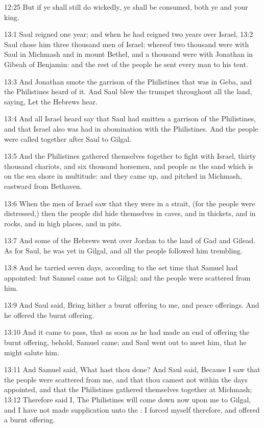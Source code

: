 12:25 But if ye shall still do wickedly, ye shall be consumed, both ye and your king.

13:1 Saul reigned one year; and when he had reigned two years over Israel, 13:2 Saul chose him three thousand men of Israel; whereof two thousand were with Saul in Michmash and in mount Bethel, and a thousand were with Jonathan in Gibeah of Benjamin: and the rest of the people he sent every man to his tent.

13:3 And Jonathan smote the garrison of the Philistines that was in Geba, and the Philistines heard of it. And Saul blew the trumpet throughout all the land, saying, Let the Hebrews hear.

13:4 And all Israel heard say that Saul had smitten a garrison of the Philistines, and that Israel also was had in abomination with the Philistines. And the people were called together after Saul to Gilgal.

13:5 And the Philistines gathered themselves together to fight with Israel, thirty thousand chariots, and six thousand horsemen, and people as the sand which is on the sea shore in multitude: and they came up, and pitched in Michmash, eastward from Bethaven.

13:6 When the men of Israel saw that they were in a strait, (for the people were distressed,) then the people did hide themselves in caves, and in thickets, and in rocks, and in high places, and in pits.

13:7 And some of the Hebrews went over Jordan to the land of Gad and Gilead. As for Saul, he was yet in Gilgal, and all the people followed him trembling.

13:8 And he tarried seven days, according to the set time that Samuel had appointed: but Samuel came not to Gilgal; and the people were scattered from him.

13:9 And Saul said, Bring hither a burnt offering to me, and peace offerings. And he offered the burnt offering.

13:10 And it came to pass, that as soon as he had made an end of offering the burnt offering, behold, Samuel came; and Saul went out to meet him, that he might salute him.

13:11 And Samuel said, What hast thou done? And Saul said, Because I saw that the people were scattered from me, and that thou camest not within the days appointed, and that the Philistines gathered themselves together at Michmash; 13:12 Therefore said I, The Philistines will come down now upon me to Gilgal, and I have not made supplication unto the \LORD: I forced myself therefore, and offered a burnt offering.

